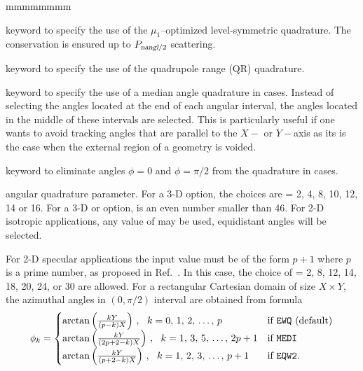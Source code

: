 \begin{ListeDeDescription}{mmmmmmmm}
\item[\moc{LSN}] keyword to specify the use of the $\mu_1$--optimized level-symmetric quadrature. The conservation is ensured up to $P_{\dusa{nangl}/2}$ scattering.

\item[\moc{QRN}] keyword to specify the use of the quadrupole range (QR) quadrature.\cite{quadrupole}

\item[\moc{MEDI}] keyword to specify the use of a median angle quadrature in  cases. Instead of
selecting the angles located at the end of each angular interval, the angles located in the middle of
these intervals are selected. This is particularly useful if one wants to avoid
tracking angles that are parallel to the $X-$ or $Y-$axis as its is the case
when the external region of a  geometry is voided.

\item[\moc{EQW2}] keyword to eliminate angles $\phi=0$ and $\phi=\pi/2$ from the  quadrature in  cases.

\item[\dusa{nangl}] angular quadrature parameter. For a 3-D  option, the choices are  = 2, 4, 8, 10, 12, 14 
or 16. For a 3-D  or  option,  is an even number smaller than 46.\cite{ige260} For 2-D 
isotropic applications, any value of  may be used, equidistant angles will be selected.

For 2-D specular applications the input value must be of the form $p + 1$ where $p$ is a prime number, as proposed
in Ref.~. In this case, the choice of  = 2, 8, 12, 14, 18, 20, 24, or 30 are allowed. For
a rectangular Cartesian domain of size $X \times Y$, the azimuthal angles in $(0,\pi/2)$ interval are obtained from formula
\begin{align*}
\phi_k=\begin{cases}
\arctan\left(\frac{kY}{(p-k)X}\right)  \, , \ \ k=0,\, 1,\, 2,\, \dots, \, p & \text{if {\tt EWQ} (default)}\\
\arctan\left(\frac{kY}{(2p+2-k)X}\right) \, , \ \ k=1,\, 3,\, 5, \, \dots, \, 2p+1 & \text{if {\tt MEDI}} \\
\arctan\left(\frac{kY}{(p+2-k)X}\right) \, , \ \ k=1,\, 2,\, 3, \, \dots, \, p+1 &\text{if {\tt EQW2}.}\\
\end{cases}
\end{align*}


\end{ListeDeDescription}
